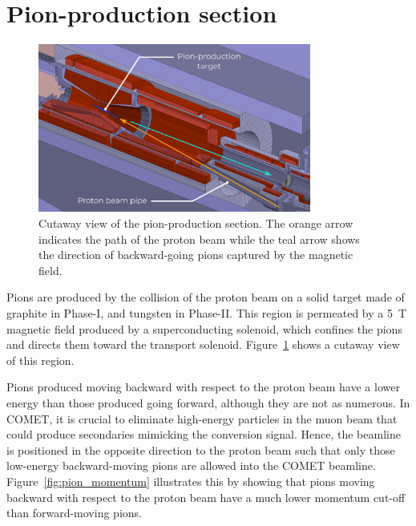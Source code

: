 \section{Pion-production section}

\begin{figure}
    \centering
    \includegraphics[width=0.8\textwidth]{chapter2/pion_production_section.png.pdf}
    \caption{ Cutaway view of the pion-production section. The orange arrow
        indicates the path of the proton beam while the teal arrow shows the
        direction of backward-going pions captured by the magnetic field.}
    \label{fig:pion_production_section}
\end{figure}

Pions are produced by the collision of the proton beam on a solid target made of
graphite in Phase-I, and tungsten in Phase-II. This region is permeated by a
\SI{5}{\tesla} magnetic field produced by a superconducting solenoid, which
confines the pions and directs them toward the transport solenoid.
Figure~\ref{fig:pion_production_section} shows a cutaway view of this
region.


Pions produced moving backward with respect to the proton beam have a lower
energy than those produced going forward, although they are not as numerous. In
COMET, it is crucial to eliminate high-energy particles in the muon beam that
could produce secondaries mimicking the conversion signal. Hence, the beamline
is positioned in the opposite direction to the proton beam such that only those
low-energy backward-moving pions are allowed into the COMET beamline.
Figure~\ref{fig:pion_momentum} illustrates this by showing that pions moving
backward with respect to the proton beam have a much lower momentum cut-off than
forward-moving pions.

